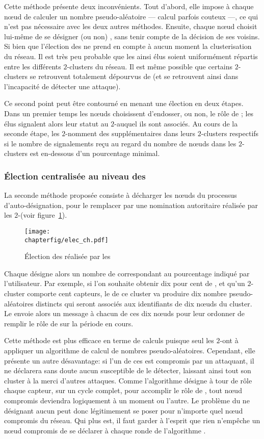 Cette méthode présente deux inconvénients.
Tout d'abord, elle impose à chaque nœud de calculer un nombre pseudo-aléatoire --- calcul parfois couteux ---, ce qui n'est pas nécessaire avec les deux autres méthodes.
Ensuite, chaque nœud choisit lui-même de se désigner (ou non) \cn, sans tenir compte de la décision de ses voisins.
Si bien que l'élection des \cns ne prend en compte à aucun moment la clusterisation du réseau.
Il est très peu probable que les \cns ainsi élus soient uniformément répartis entre les différents $2$-clusters du réseau.
Il est même possible que certains $2$-clusters se retrouvent totalement dépourvus de \cns (et se retrouvent ainsi dans l'incapacité de détecter une attaque).

Ce second point peut être contourné en menant une élection en deux étapes.
Dans un premier temps les nœuds choisissent d'endosser, ou non, le rôle de \cn; les \cns élus signalent alors leur statut au $2$-\CH auquel ils sont associés.
Au cours de la seconde étape, les $2$-\CH nomment des \cns supplémentaires dans leurs $2$-clusters respectifs si le nombre de signalements reçu au regard du nombre de nœuds dans les $2$-clusters est en-dessous d'un pourcentage minimal.

        \subsubsection{Élection centralisée au niveau des \chs}
        La seconde méthode proposée consiste à décharger les nœuds du processus d'auto-désignation, pour le remplacer par une nomination autoritaire réalisée par les $2$-\chs (voir figure~\ref{sa:fig:elecch}).
\begin{figure}[ht]
    \centering
    \texttt{[image: \\chapterfig/elec\_ch.pdf]}
    \caption{Élection des \cns réalisée par les \ch}\label{sa:fig:elecch}
\end{figure}
Chaque \CH désigne alors un nombre de \cns correspondant au pourcentage indiqué par l'utilisateur.
Par exemple, si l'on souhaite obtenir dix pour cent de \cns, et qu'un $2$-cluster comporte cent capteurs, le \CH de ce cluster va produire dix nombre pseudo-aléatoires distincts qui seront associés aux identifiants de dix nœuds du cluster.
Le \CH envoie alors un message à chacun de ces dix nœuds pour leur ordonner de remplir le rôle de \cn sur la période en cours.

Cette méthode est plus efficace en terme de calculs puisque seul les $2$-\CH ont à appliquer un algorithme de calcul de nombres pseudo-aléatoires.
Cependant, elle présente un autre désavantage: si l'un de ces \CH est compromis par un attaquant, il ne déclarera sans doute aucun \cn susceptible de le détecter, laissant ainsi tout son cluster à la merci d'autres attaques.
Comme l'algorithme \leach désigne à tour de rôle chaque capteur, sur un cycle complet, pour accomplir le rôle de \CH, tout nœud compromis deviendra logiquement \CH à un moment ou l'autre.
Le problème du \CH ne désignant aucun \cn peut donc légitimement se poser pour n'importe quel nœud compromis du réseau.
Qui plus est, il faut garder à l'esprit que rien n'empêche un nœud compromis de se déclarer \ch à chaque ronde de l'algorithme \leach.

